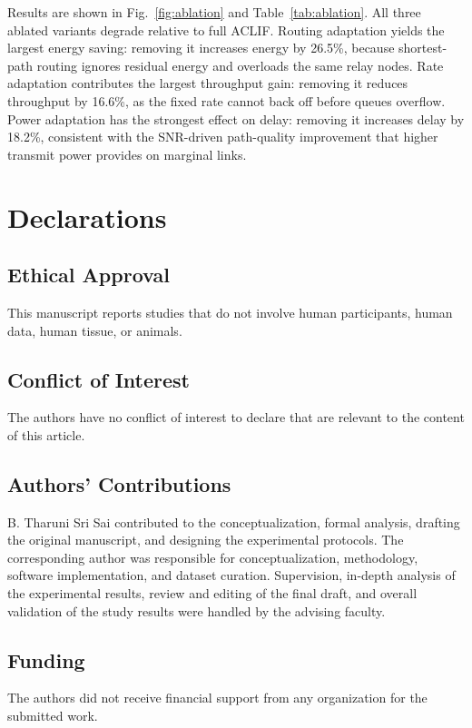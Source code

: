 \documentclass[a4paper]{cas-dc}
\numberwithin{equation}{section}
\begin{document}
Results are shown in Fig.~\ref{fig:ablation} and Table~\ref{tab:ablation}.
All three ablated variants degrade relative to full ACLIF. Routing adaptation
yields the largest energy saving: removing it increases energy by 26.5\%,
because shortest-path routing ignores residual energy and overloads the same
relay nodes. Rate adaptation contributes the largest throughput gain: removing
it reduces throughput by 16.6\%, as the fixed rate cannot back off before
queues overflow. Power adaptation has the strongest effect on delay: removing
it increases delay by 18.2\%, consistent with the SNR-driven path-quality
improvement that higher transmit power provides on marginal links.



\section*{Declarations}

\subsection*{Ethical Approval}
This manuscript reports studies that do not involve human participants, human data, human tissue, or animals.

\subsection*{Conflict of Interest}
The authors have no conflict of interest to declare that are relevant to the content of this article.

\subsection*{Authors' Contributions}
B. Tharuni Sri Sai contributed to the conceptualization, formal analysis, drafting the original manuscript, and designing the experimental protocols. The corresponding author was responsible for conceptualization, methodology, software implementation, and dataset curation. Supervision, in-depth analysis of the experimental results, review and editing of the final draft, and overall validation of the study results were handled by the advising faculty.

\subsection*{Funding}
The authors did not receive financial support from any organization for the submitted work.
\end{document}
